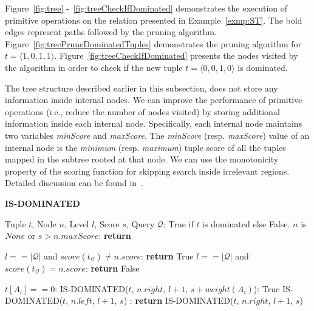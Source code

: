 Figure~\ref{fig:tree} -~\ref{fig:treeCheckIfDominated} demonstrates the execution of primitive operations on the relation presented in Example~\ref{exmp:ST}. The bold edges represent paths followed by the pruning algorithm. Figure~\ref{fig:treePruneDominatedTuples} demonstrates the pruning algorithm for $t = \langle 1,0,1,1 \rangle$. Figure~\ref{fig:treeCheckIfDominated} presents the nodes visited by the algorithm in order to check if the new tuple $t = \langle 0,0,1,0 \rangle$ is dominated.

\vspace{1mm}
The tree structure described earlier in this subsection, does not store any information inside internal nodes. We can improve the performance of primitive operations (i.e., reduce the number of nodes visited) by storing additional information inside each internal node. Specifically, each internal node maintains two variables \textit{minScore} and \textit{maxScore}. The \textit{minScore} (resp. \textit{maxScore}) value of an internal node is the \textit{minimum} (resp. \textit{maximum}) tuple score of all the tuples mapped in the subtree rooted at that node. We can use the monotonicity property of the scoring function for skipping search inside irrelevant regions. 
Detailed discussion can be found in~\cite{TechReport}.

\begin{algorithm}[htb]
\caption{{\bf IS-DOMINATED}}
\begin{algorithmic}[1]
\label{alg:isDominated}
 Tuple $t$, Node $n$, Level $l$, Score $s$, Query $\mathcal{Q}$;  True if $t$ is dominated else False.
 $n$ is $None$ or $s > n.maxScore$: {\bf return}

 $l == |\mathcal{Q}|$ and $score(t_{\mathcal{Q}}) \neq n.score$: {\bf return} True
 $l == |\mathcal{Q}|$ and $score(t_{\mathcal{Q}}) = n.score$: {\bf return} False

 $t[A_l] == 0$:
    \STATE {} IS-DOMINATED($t$, $n.right$, $l+1$, $s + weight(A_i)$):
    \STATE {} True
    \STATE {} IS-DOMINATED($t$, $n.left$, $l+1$, $s$)
: {\bf return} IS-DOMINATED($t$, $n.right$, $l+1$, $s$)
\end{algorithmic}
\end{algorithm}

